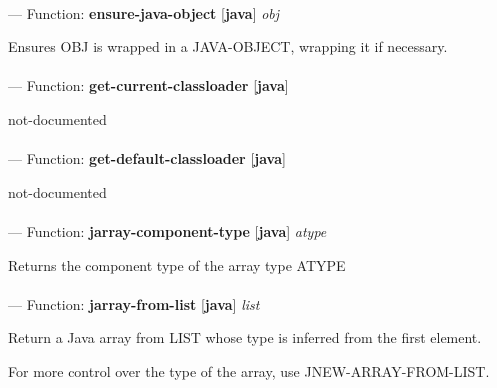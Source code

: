 \paragraph{}
\label{JAVA:ENSURE-JAVA-OBJECT}
--- Function: \textbf{ensure-java-object} [\textbf{java}] \textit{obj}

\begin{adjustwidth}{5em}{5em}
Ensures OBJ is wrapped in a JAVA-OBJECT, wrapping it if necessary.
\end{adjustwidth}

\paragraph{}
\label{JAVA:GET-CURRENT-CLASSLOADER}
--- Function: \textbf{get-current-classloader} [\textbf{java}] \textit{}

\begin{adjustwidth}{5em}{5em}
not-documented
\end{adjustwidth}

\paragraph{}
\label{JAVA:GET-DEFAULT-CLASSLOADER}
--- Function: \textbf{get-default-classloader} [\textbf{java}] \textit{}

\begin{adjustwidth}{5em}{5em}
not-documented
\end{adjustwidth}

\paragraph{}
\label{JAVA:JARRAY-COMPONENT-TYPE}
--- Function: \textbf{jarray-component-type} [\textbf{java}] \textit{atype}

\begin{adjustwidth}{5em}{5em}
Returns the component type of the array type ATYPE
\end{adjustwidth}

\paragraph{}
\label{JAVA:JARRAY-FROM-LIST}
--- Function: \textbf{jarray-from-list} [\textbf{java}] \textit{list}

\begin{adjustwidth}{5em}{5em}
Return a Java array from LIST whose type is inferred from the first element.

For more control over the type of the array, use JNEW-ARRAY-FROM-LIST.
\end{adjustwidth}

